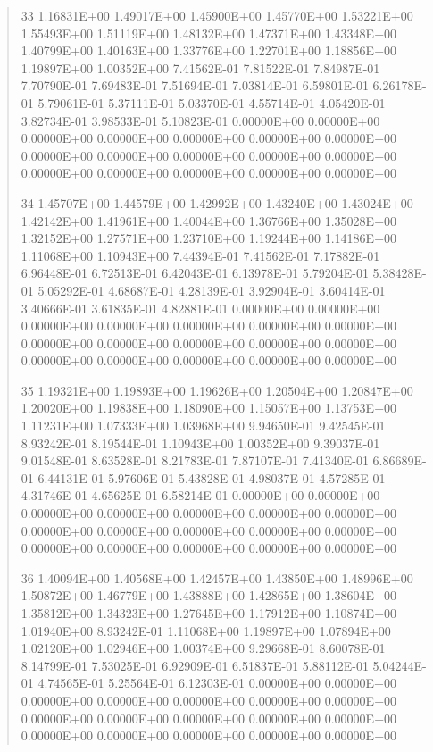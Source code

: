 \documentclass[letterpaper,10pt,english]{sphinxmanual}
\begin{document}
\begin{quote}
\begin{DUlineblock}{0em}
\item[] 33   1.16831E+00  1.49017E+00  1.45900E+00  1.45770E+00  1.53221E+00  1.55493E+00  1.51119E+00  1.48132E+00  1.47371E+00  1.43348E+00  1.40799E+00  1.40163E+00  1.33776E+00  1.22701E+00  1.18856E+00  1.19897E+00  1.00352E+00  7.41562E-01  7.81522E-01  7.84987E-01  7.70790E-01  7.69483E-01  7.51694E-01  7.03814E-01  6.59801E-01  6.26178E-01  5.79061E-01  5.37111E-01  5.03370E-01  4.55714E-01  4.05420E-01  3.82734E-01  3.98533E-01  5.10823E-01  0.00000E+00  0.00000E+00  0.00000E+00  0.00000E+00  0.00000E+00  0.00000E+00  0.00000E+00  0.00000E+00  0.00000E+00  0.00000E+00  0.00000E+00  0.00000E+00  0.00000E+00  0.00000E+00  0.00000E+00  0.00000E+00  0.00000E+00
\item[] 34   1.45707E+00  1.44579E+00  1.42992E+00  1.43240E+00  1.43024E+00  1.42142E+00  1.41961E+00  1.40044E+00  1.36766E+00  1.35028E+00  1.32152E+00  1.27571E+00  1.23710E+00  1.19244E+00  1.14186E+00  1.11068E+00  1.10943E+00  7.44394E-01  7.41562E-01  7.17882E-01  6.96448E-01  6.72513E-01  6.42043E-01  6.13978E-01  5.79204E-01  5.38428E-01  5.05292E-01  4.68687E-01  4.28139E-01  3.92904E-01  3.60414E-01  3.40666E-01  3.61835E-01  4.82881E-01  0.00000E+00  0.00000E+00  0.00000E+00  0.00000E+00  0.00000E+00  0.00000E+00  0.00000E+00  0.00000E+00  0.00000E+00  0.00000E+00  0.00000E+00  0.00000E+00  0.00000E+00  0.00000E+00  0.00000E+00  0.00000E+00  0.00000E+00
\item[] 35   1.19321E+00  1.19893E+00  1.19626E+00  1.20504E+00  1.20847E+00  1.20020E+00  1.19838E+00  1.18090E+00  1.15057E+00  1.13753E+00  1.11231E+00  1.07333E+00  1.03968E+00  9.94650E-01  9.42545E-01  8.93242E-01  8.19544E-01  1.10943E+00  1.00352E+00  9.39037E-01  9.01548E-01  8.63528E-01  8.21783E-01  7.87107E-01  7.41340E-01  6.86689E-01  6.44131E-01  5.97606E-01  5.43828E-01  4.98037E-01  4.57285E-01  4.31746E-01  4.65625E-01  6.58214E-01  0.00000E+00  0.00000E+00  0.00000E+00  0.00000E+00  0.00000E+00  0.00000E+00  0.00000E+00  0.00000E+00  0.00000E+00  0.00000E+00  0.00000E+00  0.00000E+00  0.00000E+00  0.00000E+00  0.00000E+00  0.00000E+00  0.00000E+00
\item[] 36   1.40094E+00  1.40568E+00  1.42457E+00  1.43850E+00  1.48996E+00  1.50872E+00  1.46779E+00  1.43888E+00  1.42865E+00  1.38604E+00  1.35812E+00  1.34323E+00  1.27645E+00  1.17912E+00  1.10874E+00  1.01940E+00  8.93242E-01  1.11068E+00  1.19897E+00  1.07894E+00  1.02120E+00  1.02946E+00  1.00374E+00  9.29668E-01  8.60078E-01  8.14799E-01  7.53025E-01  6.92909E-01  6.51837E-01  5.88112E-01  5.04244E-01  4.74565E-01  5.25564E-01  6.12303E-01  0.00000E+00  0.00000E+00  0.00000E+00  0.00000E+00  0.00000E+00  0.00000E+00  0.00000E+00  0.00000E+00  0.00000E+00  0.00000E+00  0.00000E+00  0.00000E+00  0.00000E+00  0.00000E+00  0.00000E+00  0.00000E+00  0.00000E+00

\end{DUlineblock}
\end{quote}
\end{document}
